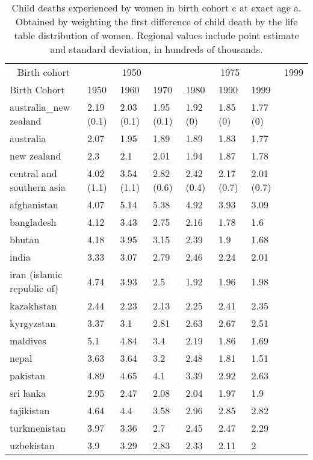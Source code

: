 \begin{table}[!h]

\caption{\label{tab:S8}Child deaths experienced by women in birth cohort c at exact age a. Obtained by weighting the first difference of child death by the life table distribution of women. Regional values include point estimate and standard deviation, in hundreds of thousands.}
\centering
\begin{tabular}[t]{lllllll}
\toprule
\multicolumn{1}{c}{Birth cohort} & \multicolumn{3}{c}{1950} & \multicolumn{3}{c}{1975} & \multicolumn{3}{c}{1999} \\
\cmidrule(l{3pt}r{3pt}){1-1} \cmidrule(l{3pt}r{3pt}){2-4} \cmidrule(l{3pt}r{3pt}){5-7} \cmidrule(l{3pt}r{3pt}){8-10}
Birth Cohort & 1950 & 1960 & 1970 & 1980 & 1990 & 1999\\
\midrule
australia\_new zealand & 2.19 (0.1) & 2.03 (0.1) & 1.95 (0.1) & 1.92 (0) & 1.85 (0) & 1.77 (0)\\
australia & 2.07 & 1.95 & 1.89 & 1.89 & 1.83 & 1.77\\
new zealand & 2.3 & 2.1 & 2.01 & 1.94 & 1.87 & 1.78\\
central and southern asia & 4.02 (1.1) & 3.54 (1.1) & 2.82 (0.6) & 2.42 (0.4) & 2.17 (0.7) & 2.01 (0.7)\\
afghanistan & 4.07 & 5.14 & 5.38 & 4.92 & 3.93 & 3.09\\
\addlinespace
bangladesh & 4.12 & 3.43 & 2.75 & 2.16 & 1.78 & 1.6\\
bhutan & 4.18 & 3.95 & 3.15 & 2.39 & 1.9 & 1.68\\
india & 3.33 & 3.07 & 2.79 & 2.46 & 2.24 & 2.01\\
iran (islamic republic of) & 4.74 & 3.93 & 2.5 & 1.92 & 1.96 & 1.98\\
kazakhstan & 2.44 & 2.23 & 2.13 & 2.25 & 2.41 & 2.35\\
\addlinespace
kyrgyzstan & 3.37 & 3.1 & 2.81 & 2.63 & 2.67 & 2.51\\
maldives & 5.1 & 4.84 & 3.4 & 2.19 & 1.86 & 1.69\\
nepal & 3.63 & 3.64 & 3.2 & 2.48 & 1.81 & 1.51\\
pakistan & 4.89 & 4.65 & 4.1 & 3.39 & 2.92 & 2.63\\
sri lanka & 2.95 & 2.47 & 2.08 & 2.04 & 1.97 & 1.9\\
\addlinespace
tajikistan & 4.64 & 4.4 & 3.58 & 2.96 & 2.85 & 2.82\\
turkmenistan & 3.97 & 3.36 & 2.7 & 2.45 & 2.47 & 2.29\\
uzbekistan & 3.9 & 3.29 & 2.83 & 2.33 & 2.11 & 2\\

\end{tabular}
\end{table}
